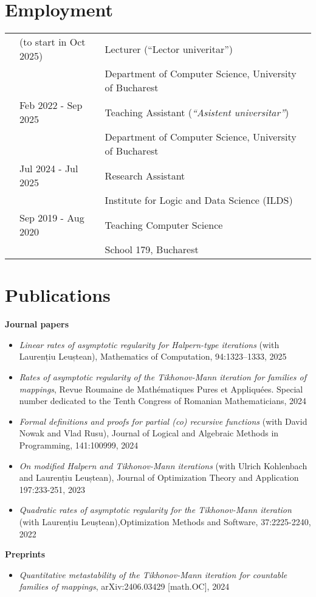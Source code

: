 \documentclass[letterpaper,11pt,oneside]{article}
\begin{document}
\noindent
\section{Employment}
\normalsize
\begin{tabular}{@{} l l l}
        & (to start in Oct 2025) & Lecturer (``Lector univeritar'') \\
        &                    & Department of Computer Science, University of Bucharest \\
        & Feb 2022 - Sep 2025 & Teaching Assistant (\textit{``Asistent universitar''}) \\ 
        &                & Department of Computer Science, University of Bucharest \\
        & Jul 2024 - Jul 2025 & Research Assistant \\ 
        &                    & Institute for Logic and Data Science (ILDS) \\
        & Sep 2019 - Aug 2020    & Teaching Computer Science \\
        &                & School 179, Bucharest 
\end{tabular}


\noindent
\section{Publications} 
\large\textbf{Journal papers}
\normalsize
\begin{itemize}
    \item \emph{Linear rates of asymptotic regularity for Halpern-type iterations} (with Laurențiu Leuștean), Mathematics of Computation, 94:1323--1333, 2025
    \item \emph{Rates of asymptotic regularity of the Tikhonov-Mann iteration for families of mappings}, {Revue Roumaine de Math\'{e}matiques Pures et Appliqu\'{e}es. Special number dedicated to the Tenth Congress of Romanian Mathematicians}, 2024
    \item \emph{Formal definitions and proofs for partial (co) recursive functions} (with David Nowak and Vlad Rusu), Journal of Logical and Algebraic Methods in Programming, 141:100999, 2024
    \item \emph{On modified Halpern and Tikhonov-Mann iterations} (with Ulrich Kohlenbach and Laurențiu Leuștean), Journal of Optimization Theory and Application 197:233-251, 2023
    \item \emph{Quadratic rates of asymptotic regularity for the Tikhonov-Mann iteration} (with Laurențiu Leuștean),Optimization Methods and Software, 37:2225-2240, 2022
\end{itemize}
\large\textbf{Preprints}
\begin{itemize}
    \item \emph{Quantitative metastability of the Tikhonov-Mann iteration for countable families of mappings}, 	arXiv:2406.03429 [math.OC], 2024
\end{itemize}
\mbox{} 
\end{document}
